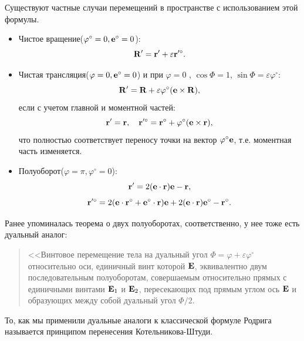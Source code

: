 Существуют частные случаи перемещений в пространстве с использованием этой формулы.
\begin{itemize}
    \item Чистое вращение($\varphi^\circ = 0, \vb{e}^\circ = 0$):
        \begin{equation*}
            \vb{R}' = \vb{r}' + \varepsilon \vb{r}'^\circ.
        \end{equation*}
    \item Чистая трансляция($\varphi = 0, \vb{e}^\circ = 0$) и при $\varphi = 0$ , $\cos \Phi = 1$, $\sin \Phi = \varepsilon \varphi^\circ$:
        \begin{equation*}
            \vb{R}' = \vb{R} + \varepsilon \varphi^\circ (\vb{e} \times \vb{R}),
        \end{equation*}
        если с учетом главной и моментной частей:
        \begin{equation*}
            \vb{r}' = \vb{r}, \quad \vb{r}'^\circ = \vb{r}^\circ + \varphi^\circ (\vb{e} \times \vb{r}),
        \end{equation*}
        что полностью соответствует переносу точки на вектор $\varphi^\circ \vb{e}$, т.е. моментная часть изменяется.
    \item Полуоборот($\varphi = \pi, \varphi^\circ = 0$):
        \begin{equation*}
            \vb{r}' = 2(\vb{e} \cdot \vb{r})\vb{e} - \vb{r},
        \end{equation*}
        \begin{equation*}
            \vb{r}'^\circ = 2(\vb{e} \cdot \vb{r}^\circ + \vb{e}^\circ \cdot \vb{r})\vb{e} + 2(\vb{e} \cdot \vb{r})\vb{e}^\circ - \vb{r}^\circ.
        \end{equation*}
\end{itemize}

Ранее упоминалась теорема о двух полуоборотах, соответственно, у нее тоже есть дуальный аналог:
\begin{quote}
    <<Винтовое перемещение тела на дуальный угол $\Phi = \varphi + \varepsilon \varphi^\circ$ относительно оси, единичный винт которой $\vb{E}$, эквивалентно двум последовательным полуоборотам, совершаемым относительно прямых с единичными винтами $\vb{E}_1$ и $\vb{E}_2$, пересекающих под прямым углом ось $\vb{E}$ и образующих между собой дуальный угол $\Phi/2$.
\end{quote}
То, как мы применили дуальные аналоги к классической формуле Родрига называется принципом перенесения Котельникова-Штуди.

